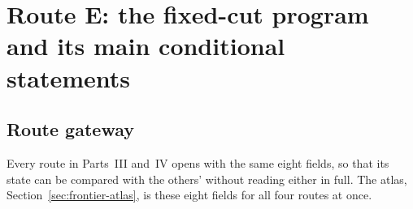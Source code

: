 \documentclass[../../main.tex]{subfiles}
\begin{document}
\section{Route E: the fixed-cut program and its main conditional statements}
\label{sec:introduction}

\subsection*{Route gateway}

Every route in Parts~III and~IV opens with the same eight fields, so that its state can be
compared with the others' without reading either in full. The atlas,
Section~\ref{sec:frontier-atlas}, is these eight fields for all four routes at once.
\end{document}
